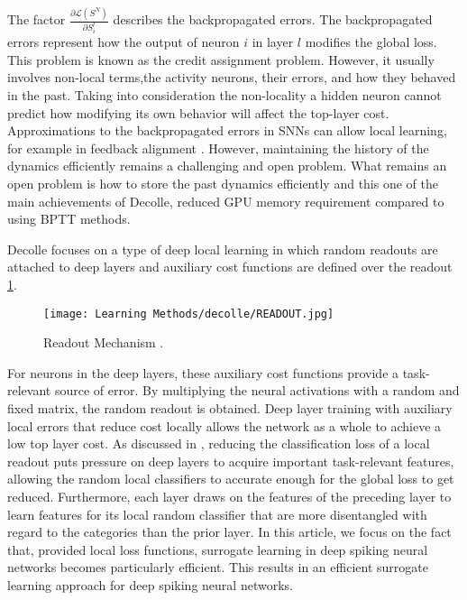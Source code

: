 \documentclass[12pt]{report}
\begin{document}
The factor $\frac{\partial \mathcal{L}\left(S^{N}\right)}{\partial S_{i}^{l}}$ describes the backpropagated errors. The backpropagated errors represent how the output of neuron $i$ in layer $l$ modifies the global loss. This problem is known as the credit assignment problem. However, it usually involves non-local terms,the activity neurons, their errors, and how they behaved in the past. Taking into consideration the non-locality a hidden neuron cannot predict how modifying its own behavior will affect the top-layer cost. Approximations to the backpropagated errors in SNNs can allow local learning, for example in feedback alignment \cite{lillicrap2016}. However, maintaining the history of the dynamics efficiently remains a challenging and open problem. What remains an open problem is how to store the past dynamics efficiently  and this one of the main achievements of Decolle, reduced GPU memory requirement compared to using BPTT methods.

Decolle focuses on a type of deep local learning in which random readouts are attached to deep layers and auxiliary cost functions are defined over the readout \ref{fig:readout}.
\begin{figure}[htp]
    \centering
    \texttt{[image: Learning Methods/decolle/READOUT.jpg]}
    \caption{Readout Mechanism . 
    \label{fig:readout}}
\end{figure}

For neurons in the deep layers, these auxiliary cost functions provide a task-relevant source of error. By multiplying the neural activations with a random and fixed matrix, the random readout is obtained. Deep layer training with auxiliary local errors that reduce cost locally allows the network as a whole to achieve a low top layer cost. As discussed in \cite{mostafa2017}, reducing the classification loss of a local readout puts pressure on deep layers to acquire important task-relevant features, allowing the random local classifiers to accurate enough for the global loss to get reduced.  Furthermore, each layer draws on the features of the preceding layer to learn features for its local random classifier that are more disentangled with regard to the categories than the prior layer. In this article, we focus on the fact that, provided local loss functions, surrogate learning in deep spiking neural networks becomes particularly efficient. This results in an efficient surrogate learning approach for deep spiking neural networks.
\end{document}
